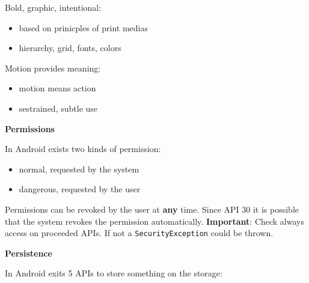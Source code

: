 \documentclass[11pt,twoside,landscape]{article}
\begin{document}
\begin{multicols}{3}
Bold, graphic, intentional:
\begin{itemize}
\item based on prinicples of print medias
\item hierarchy, grid, fonts, colors
\end{itemize}

Motion provides meaning:
\begin{itemize}
\item motion means action
\item sestrained, subtle use
\end{itemize}


\textbf{Permissions}

In Android exists two kinds of permission:
\begin{itemize}
\item normal, requested by the system
\item dangerous, requested by the user
\end{itemize}

Permissions can be revoked by the user at \textbf{any} time.
Since API 30 it is possible that the system revokes the permission automatically.
\textbf{Important}: Check always access on proceeded APIs.
If not a \texttt{SecurityException} could be thrown.


\textbf{Persistence}

In Android exits 5 APIs to store something on the storage:


\end{multicols}
\end{document}
